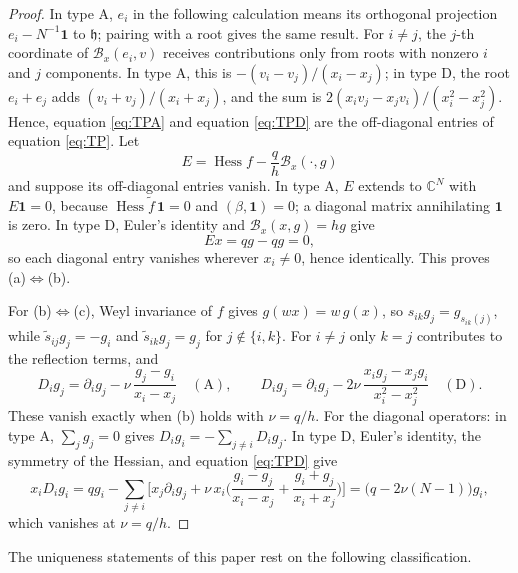 \documentclass[10pt,reqno]{amsart}
\numberwithin{equation}{section}
\theoremstyle{plain}
\theoremstyle{definition}
\DeclareMathOperator{\Hess}{Hess}
\begin{document}
\begin{proof}
In type A, $e_i$ in the following calculation means its orthogonal projection $e_i-N^{-1}\mathbf 1$ to $\mathfrak h$; pairing with a root gives the same result. For $i\neq j$, the $j$-th coordinate of $\mathcal{B}_x(e_i,v)$ receives contributions only from roots with nonzero $i$ and $j$ components. In type A, this is $-(v_i-v_j)/(x_i-x_j)$; in type D, the root $e_i+e_j$ adds $(v_i+v_j)/(x_i+x_j)$, and the sum is $2(x_iv_j-x_jv_i)/(x_i^2-x_j^2)$. Hence, equation \eqref{eq:TPA} and equation \eqref{eq:TPD} are the off-diagonal entries of equation \eqref{eq:TP}. Let 
\begin{equation*}
    E=\Hess f-\frac qh\mathcal{B}_x(\cdot,g)
\end{equation*}
and suppose its off-diagonal entries vanish. In type A, $E$ extends to $\mathbb{C}^N$ with $E\mathbf 1=0$, because $\Hess\tilde f\,\mathbf 1=0$ and $(\beta,\mathbf 1)=0$; a diagonal matrix annihilating $\mathbf 1$ is zero. In type D, Euler's identity and $\mathcal{B}_x(x,g)=hg$ give 
\begin{equation*}
    Ex=qg-qg=0 ,
\end{equation*}
so each diagonal entry vanishes wherever $x_i\neq0$, hence identically. This proves (a)$\Leftrightarrow$(b).

For (b)$\Leftrightarrow$(c), Weyl invariance of $f$ gives $g(wx)=w\,g(x)$, so $s_{ik}g_j=g_{s_{ik}(j)}$, while $\tilde s_{ij}g_j=-g_i$ and $\tilde s_{ik}g_j=g_j$ for $j\notin\{i,k\}$. For $i\neq j$ only $k=j$ contributes to the reflection terms, and
\begin{equation*}
	D_ig_j=\partial_ig_j-\nu\,\frac{g_j-g_i}{x_i-x_j}\quad(\text{A}),\qquad D_ig_j=\partial_ig_j-2\nu\,\frac{x_ig_j-x_jg_i}{x_i^2-x_j^2}\quad(\text{D}).
\end{equation*}
These vanish exactly when (b) holds with $\nu=q/h$. For the diagonal operators: in type A, $\sum_jg_j=0$ gives $D_ig_i=-\sum_{j\neq i}D_ig_j$. In type D, Euler's identity, the symmetry of the Hessian, and equation \eqref{eq:TPD} give
\begin{equation*}
	x_iD_ig_i=qg_i-\sum_{j\neq i}\Big[x_j\partial_ig_j+\nu\,x_i\Big(\frac{g_i-g_j}{x_i-x_j}+\frac{g_i+g_j}{x_i+x_j}\Big)\Big]=\big(q-2\nu(N-1)\big)g_i ,
\end{equation*}
which vanishes at $\nu=q/h$.
\end{proof}

The uniqueness statements of this paper rest on the following classification.
\end{document}
